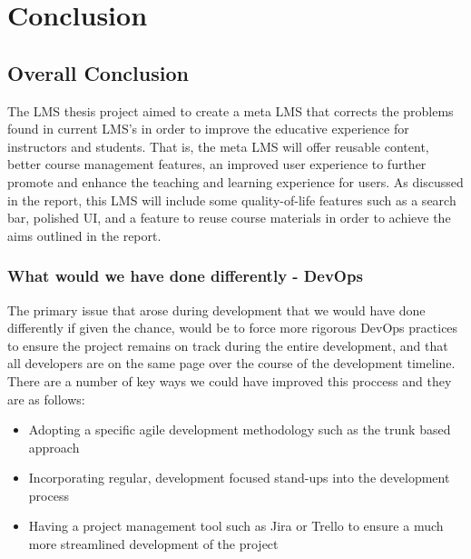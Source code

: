 \chapter{Conclusion}\label{ch:conclusion}










\section{Overall Conclusion}
The LMS thesis project aimed to create a meta LMS that corrects the problems found in current LMS’s 
in order to improve the educative experience for instructors and students. That is, the meta LMS will 
offer reusable content, better course management features, an improved user experience to further promote 
and enhance the teaching and learning experience for users. As discussed in the report, this LMS will include 
some quality-of-life features such as a search bar, polished UI, and a feature to reuse course materials in order 
to achieve the aims outlined in the report.


\subsection{What would we have done differently - DevOps}
The primary issue that arose during development that we would have done differently if given the chance, would be to force more rigorous DevOps practices to ensure the project remains on track during the entire development, and that all developers are on the same page over the course of the development timeline. There are a number of key ways we could have improved this proccess and they are as follows:

\begin{itemize}
    \item Adopting a specific agile development methodology such as the trunk based approach \cite{trunk}
    \item Incorporating regular, development focused stand-ups into the development process
    \item Having a project management tool such as Jira or Trello to ensure a much more streamlined development of the project
\end{itemize}

